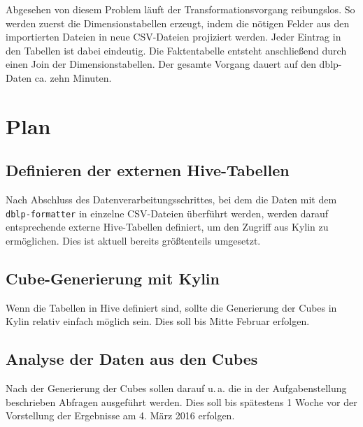 \documentclass[a4paper,11pt,utf8]{scrartcl}
\begin{document}
Abgesehen von diesem Problem läuft der Transformationsvorgang reibungslos. So werden zuerst die Dimensionstabellen erzeugt, indem die nötigen Felder aus den importierten Dateien in neue CSV-Dateien projiziert werden. Jeder Eintrag in den Tabellen ist dabei eindeutig. Die Faktentabelle entsteht anschließend durch einen Join der Dimensionstabellen. Der gesamte Vorgang dauert auf den dblp-Daten ca. zehn Minuten.

\section{Plan}
\label{sec:plan}

\subsection{Definieren der externen Hive-Tabellen}

Nach Abschluss des Datenverarbeitungsschrittes, bei dem die Daten mit dem \texttt{dblp-formatter} in einzelne CSV-Dateien überführt werden, werden darauf entsprechende externe Hive-Tabellen definiert, um den Zugriff aus Kylin zu ermöglichen. Dies ist aktuell bereits größtenteils umgesetzt.

\subsection{Cube-Generierung mit Kylin}

Wenn die Tabellen in Hive definiert sind, sollte die Generierung der Cubes in Kylin relativ einfach möglich sein. Dies soll bis Mitte Februar erfolgen.

\subsection{Analyse der Daten aus den Cubes}

Nach der Generierung der Cubes sollen darauf u.\,a. die in der Aufgabenstellung beschrieben Abfragen ausgeführt werden. Dies soll bis spätestens 1 Woche vor der Vorstellung der Ergebnisse am 4. März 2016 erfolgen.
\end{document}

